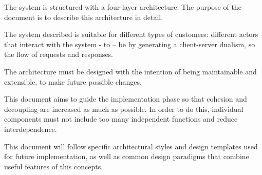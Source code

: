\documentclass{article}
\begin{document}
	The system is structured with a four-layer architecture. The purpose of the document is to describe this architecture in detail.

	\bigskip
	The system described is suitable for different types of customers: different actors that interact with the system - to – be by generating a client-server dualism, so the flow of requests and responses.
	
	The architecture must be designed with the intention of being maintainable and extensible, to make future possible changes.
	
	\bigskip
	This document aims to guide the implementation phase so that cohesion and decoupling are increased as much as possible. In order to do this, individual components must not include too many independent functions and reduce interdependence.
	
	This document will follow specific architectural styles and design templates used for future implementation, as well as common design paradigms that combine useful features of this concepts.


	
\end{document}
